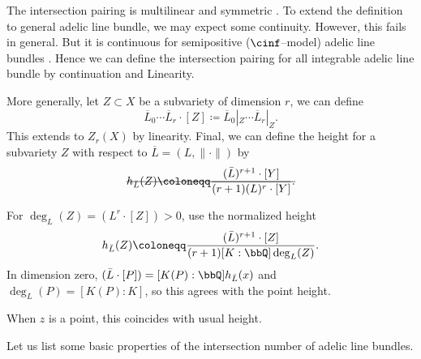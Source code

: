 \begin{construction}[label=\labelNFM{constr:intersection-number-of-adelic-line-bundles}, status=draft, tag=0000000]
	The intersection pairing is multilinear and symmetric .
	To extend the definition to general adelic line bundle, we may expect some continuity.
	However, this fails in general.
	But it is continuous for semipositive ($\cinf$--model) adelic line bundles .
	Hence we can define the intersection pairing for all integrable adelic line bundle by continuation and Linearity.

	More generally, let $Z\subset X$ be a subvariety of dimension $r$, we can define
	\[ \overline{L}_0 \cdots \overline{L}_r \cdot [Z] \coloneqq \overline{L}_0|_Z \cdots \overline{L}_r|_Z. \]
	This extends to $Z_r(X)$ by linearity.
	Final, we can define the height for a subvariety $Z$ with respect to $\overline{L}=(L,\|\cdot\|)$ by
	\[ \latexdeletedmath{h_{\bar L}(Z) \coloneqq \frac{(\bar L)^{r+1}\cdot[Y]}{(r+1)(L)^r\cdot [Y]}.} \]
	\begin{latexmathchange}
		For $\deg_L(Z) = (L^r\cdot[Z]) > 0$, use the normalized height
		\[ h_{\bar L}(Z) \coloneqq \frac{(\bar L)^{r+1}\cdot[Z]}{(r+1)[K:\bbQ]\deg_L(Z)}. \]
		In dimension zero, $(\bar L\cdot[P]) = [K(P):\bbQ]h_{\bar L}(x)$ and $\deg_L(P) = [K(P):K]$, so this agrees with the point height.
	\end{latexmathchange}
	When $z$ is a point, this coincides with usual height.\Yang{}
\end{construction}

Let us list some basic properties of the intersection number of adelic line bundles.

